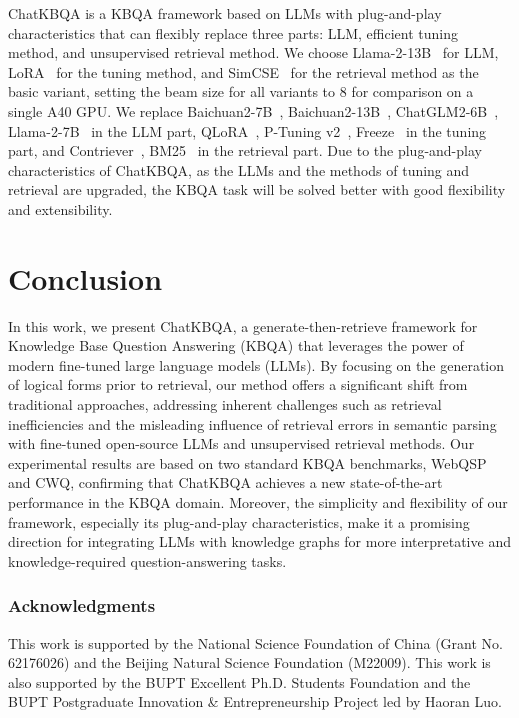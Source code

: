 \documentclass{article} \usepackage{iclr2024_conference,times}
\begin{document}
\begin{table*}[t]

\end{table*}

ChatKBQA is a KBQA framework based on LLMs with plug-and-play characteristics that can flexibly replace three parts: LLM, efficient tuning method, and unsupervised retrieval method. We choose Llama-2-13B~\citep{Llama2} for LLM, LoRA~\citep{LoRA} for the tuning method, and SimCSE~\citep{SimCSE} for the retrieval method as the basic variant, setting the beam size for all variants to 8 for comparison on a single A40 GPU. We replace Baichuan2-7B~\citep{Baichuan2}, Baichuan2-13B~\citep{Baichuan2}, ChatGLM2-6B~\citep{GLM}, Llama-2-7B~\citep{Llama2} in the LLM part, QLoRA~\citep{QLoRA}, P-Tuning v2~\citep{P-Tuningv2}, Freeze~\citep{Freeze} in the tuning part, and Contriever~\citep{Contriever}, BM25~\citep{BM25} in the retrieval part. Due to the plug-and-play characteristics of ChatKBQA, as the LLMs and the methods of tuning and retrieval are upgraded, the KBQA task will be solved better with good flexibility and extensibility.







\section{Conclusion}

In this work, we present ChatKBQA, a generate-then-retrieve framework for Knowledge Base Question Answering (KBQA) that leverages the power of modern fine-tuned large language models (LLMs). By focusing on the generation of logical forms prior to retrieval, our method offers a significant shift from traditional approaches, addressing inherent challenges such as retrieval inefficiencies and the misleading influence of retrieval errors in semantic parsing with fine-tuned open-source LLMs and unsupervised retrieval methods. Our experimental results are based on two standard KBQA benchmarks, WebQSP and CWQ, confirming that ChatKBQA achieves a new state-of-the-art performance in the KBQA domain. Moreover, the simplicity and flexibility of our framework, especially its plug-and-play characteristics, make it a promising direction for integrating LLMs with knowledge graphs for more interpretative and knowledge-required question-answering tasks.











\subsubsection*{Acknowledgments}
This work is supported by the National Science Foundation of China (Grant No. 62176026) and the Beijing Natural Science Foundation (M22009). This work is also supported by the BUPT Excellent Ph.D. Students Foundation and the BUPT Postgraduate Innovation \& Entrepreneurship Project led by Haoran Luo.






\appendix
\end{document}
